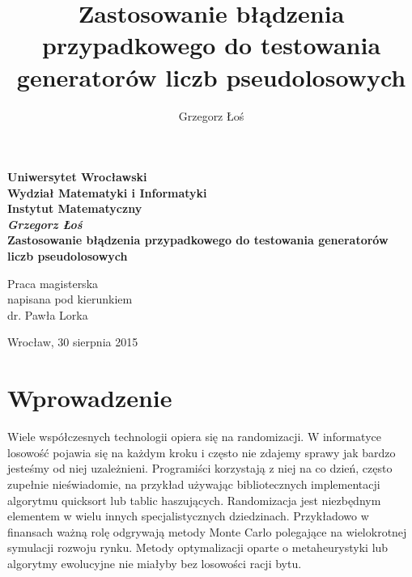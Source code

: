 \documentclass[a4paper,11pt,twoside]{book}
\title{Zastosowanie błądzenia przypadkowego do testowania generatorów liczb pseudolosowych}
\author{Grzegorz Łoś}
\theoremstyle{definition}
\begin{document}
\thispagestyle{empty}
\begin{center}
\textbf{\large Uniwersytet Wrocławski\\
Wydział Matematyki i Informatyki\\
Instytut Matematyczny}\\
\vspace{4cm}
\textbf{\textit{\large Grzegorz Łoś}\\
\vspace{0.5cm}
{\Large Zastosowanie błądzenia przypadkowego do testowania generatorów liczb pseudolosowych}}\\
\end{center}
\vspace{3cm}
{\large \hspace*{6.5cm}Praca magisterska\\
\hspace*{6.5cm}napisana pod kierunkiem\\
\hspace*{6.5cm}dr. Pawła Lorka }\\
\vfill
\begin{center}
{\large Wrocław, 30 sierpnia 2015}\\
\end{center}

\newpage
\thispagestyle{empty}
\begin{minipage}{0.5\linewidth}
\end{minipage}

\newpage


\begin{minipage}{0.8\linewidth}
\tableofcontents
\end{minipage}

\chapter*{Wprowadzenie}
Wiele współczesnych technologii opiera się na randomizacji. W informatyce losowość pojawia się na każdym kroku i często nie zdajemy sprawy jak bardzo jesteśmy od niej uzależnieni. Programiści korzystają z niej na co dzień, często zupełnie nieświadomie, na przykład używając bibliotecznych implementacji algorytmu quicksort lub tablic haszujących. Randomizacja jest niezbędnym elementem w wielu innych specjalistycznych dziedzinach. Przykładowo w finansach ważną rolę odgrywają metody Monte Carlo polegające na wielokrotnej symulacji rozwoju rynku. Metody optymalizacji oparte o metaheurystyki lub algorytmy ewolucyjne nie miałyby bez losowości racji bytu.
\end{document}
